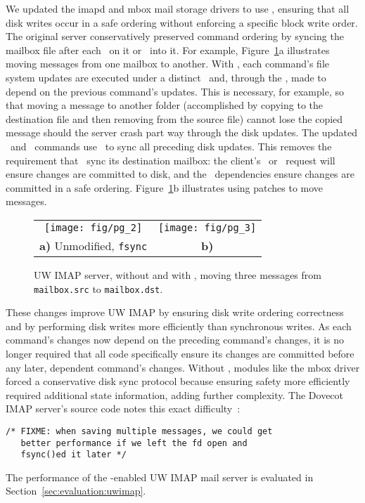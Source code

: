 We updated the imapd and mbox mail storage drivers to use
\patchgroups, ensuring that all disk writes occur in a safe ordering
without enforcing a specific block write order.
%
The original server conservatively preserved command ordering by
syncing the mailbox file after each \imapCheck\ on it or \imapCopy\ into it.
%
For example, Figure~\ref{fig:imap}a illustrates moving messages from
one mailbox to another.
%
With \patchgroups, each command's file system updates are executed under a
distinct \patchgroup\ and, through the \patchgroup, made to depend on the
previous command's updates. This is necessary, for example, so that
moving a message to another folder (accomplished by copying to the
destination file and then removing from the source file) cannot lose
the copied message should the server crash part way through the disk
updates.
%
The updated \imapCheck\ and \imapExpunge\ commands use \pgSync\ to sync all preceding disk
updates. This removes the requirement that \imapCopy\
sync its destination mailbox: the client's \imapCheck\ or \imapExpunge\ request will ensure
changes are committed to disk, and the \patchgroup\ dependencies ensure
changes are committed in a safe ordering.
%
Figure~\ref{fig:imap}b illustrates using patches to move messages.

\begin{figure}[tb]
\centering
\begin{tabular}{@{}cc@{}}
\texttt{[image: fig/pg\_2]} & 
\texttt{[image: fig/pg\_3]}\\
\textbf{a)} Unmodified, \texttt{fsync} & 
\textbf{b)} \Patchgroups
\end{tabular}
\caption{UW IMAP server, without and with \patchgroups, moving three
messages from \texttt{mailbox.src} to \texttt{mailbox.dst}.}
\label{fig:imap}
\end{figure}

These changes improve UW IMAP by
%
ensuring disk write ordering correctness
%
and by performing disk writes more efficiently than synchronous writes.
%
As each command's changes now depend on the preceding command's
changes, it is no longer required that all code
specifically ensure its changes are committed before any later, dependent
command's changes. Without \patchgroups, modules like the mbox driver
forced a conservative disk sync protocol because ensuring safety more
efficiently required additional state information, adding further
complexity. The Dovecot IMAP server's source code notes this exact
difficulty~\cite[maildir-save.c]{dovecot}:

\vspace{-0.5\baselineskip}
\begin{scriptsize}
\begin{verbatim}
/* FIXME: when saving multiple messages, we could get
   better performance if we left the fd open and
   fsync()ed it later */
\end{verbatim}
\end{scriptsize}
\vspace{-0.5\baselineskip}

The performance of the \patchgroup{}-enabled UW IMAP mail server is
evaluated in Section~\ref{sec:evaluation:uwimap}.
